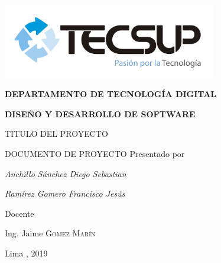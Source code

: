\begin{titlepage}
\centering
\includegraphics[width=0.70\textwidth]{img/logo_tecsup_final}\par\vspace{1cm}
\vspace{0.30cm}
{\scshape\large\bfseries DEPARTAMENTO DE TECNOLOG\'IA DIGITAL \par}
\vspace{0.60cm}
{\scshape\large\bfseries DISEÑO Y DESARROLLO DE SOFTWARE  \par}
\vspace{2.00cm}
{\large\large TITULO DEL PROYECTO \par}
\vspace{0.60cm}
{\scshape\large DOCUMENTO DE PROYECTO }
\vspace{0.60cm}
\vfill
Presentado por \par
{\large\itshape { Anchillo Sánchez Diego Sebastian }\par}
{\large\itshape { Ramírez Gomero Francisco Jesús }\par}
\vspace{0.30cm}
\vfill
Docente \par
Ing. Jaime  \textsc{ Gomez Marín}

 \vspace{0.30cm}
\vfill
       {\large Lima , 2019 \par}
\end{titlepage}

